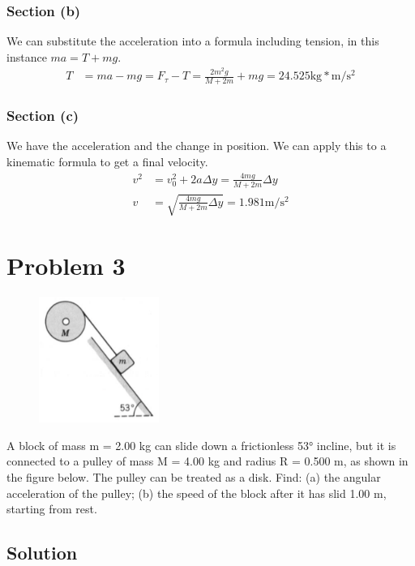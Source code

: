 \documentclass[12pt]{article}
\begin{document}
\subsubsection{Section (b)}
We can substitute the acceleration into a formula including tension, in this instance \(ma = T + mg\).
\begin{align}
    T   &=  ma - mg
        =   F_\tau - T
        =   \frac{2m^2g}{M + 2m} + mg
        =   \boxed{24.525\unit{\kilo\gram*\meter/\second^2}}
\end{align}

\subsubsection{Section (c)}
We have the acceleration and the change in position. We can apply this to a kinematic formula to get a final velocity.
\begin{align}
    v^2 &=  v_0^2 + 2a\Delta y
        =   \frac{4mg}{M + 2m}\Delta y\\
    v   &=  \sqrt{\frac{4mg}{M + 2m}\Delta y}
        =   \boxed{1.981\unit{\meter/\second^2}}
\end{align}

\pagebreak
\section{Problem 3}
\begin{figure}
    \vspace{-30pt}
    \includegraphics[width=0.35\textwidth]{graph_3.png} 
\end{figure}
A block of mass m = 2.00 kg can slide down a frictionless 53\unit{\degree} incline, but it is connected to a pulley of mass M = 4.00 kg and radius R = 0.500 m, as shown in the figure below. The pulley can be treated as a disk. Find: (a) the angular acceleration of the pulley; (b) the speed of the block after it has slid 1.00 m, starting from rest.

\subsection{Solution}
\end{document}
